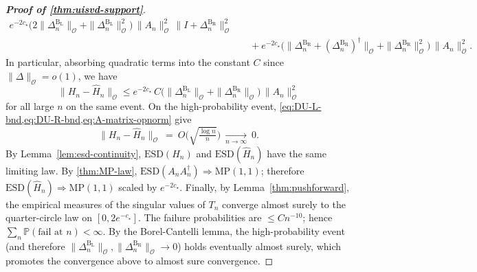 \documentclass[11pt,a4paper]{article}
\newcommand{\be}{\begin{equation}}
\newcommand{\ee}{\end{equation}}
\newcommand{\op}{\mathcal{O}}
\newcommand{\Prob}{\mathbb{P}}
\begin{document}
\begin{proof}[\textbf{Proof of \cref{thm:uisvd-support}}]
\begin{equation}
\begin{aligned}
e^{-2c_\star}
\Big(2\|\Delta^{\mathrm{B_L}}_{n}\|_{\op}
 +\|\Delta^{\mathrm{B_L}}_{n}\|_{\op}^2\Big)
\,\|A_n\|_{\op}^2
\,\|I+\Delta^{\mathrm{B_R}}_{n}\|_{\op}^2
\\
&\quad
+e^{-2c_\star}
\Big(\|\Delta^{\mathrm{B_R}}_{n}
 +(\Delta^{\mathrm{B_R}}_{n})^\dagger\|_{\op}
 +\|\Delta^{\mathrm{B_R}}_{n}\|_{\op}^2\Big)
\,\|A_n\|_{\op}^2.
\end{aligned}
\end{equation}
In particular, absorbing quadratic terms into the constant $C$ since $\|\Delta\|_{\op}=o(1)$, we have
\be\label{eq:105ref}
\|H_n-\widehat H_n\|_{\op}
\le e^{-2c_\star}\,C\bigl(\|\Delta^{\mathrm{B_L}}_{n}\|_{\op}+\|\Delta^{\mathrm{B_R}}_{n}\|_{\op}\bigr)\,\|A_n\|_{\op}^2
\ee
for all large $n$ on the same event. On the high-probability event, \cref{eq:DU-L-bnd,eq:DU-R-bnd,eq:A-matrix-opnorm} give
\begin{equation}
\|H_n-\widehat H_n\|_{\op}\ =\ O\!\Big(\sqrt{\tfrac{\log n}{n}}\Big)\ \xrightarrow[n\to\infty]{}\ 0.
\end{equation}
By Lemma~\ref{lem:esd-continuity}, $\mathrm{ESD}(H_n)$ and $\mathrm{ESD}(\widehat H_n)$ have the same limiting law. By \cref{thm:MP-law}, $\mathrm{ESD}(A_nA_n^\dagger)\Rightarrow \mathrm{MP}(1,1)$; therefore $\mathrm{ESD}(\widehat H_n)\Rightarrow \mathrm{MP}(1,1)$ scaled by $e^{-2c_\star}$. Finally, by Lemma~\ref{thm:pushforward}, the empirical measures of the singular values of $T_n$ converge almost surely to the quarter-circle law on $[0,2e^{-c_\star}]$. The failure probabilities are $\le C n^{-10}$; hence $\sum_n \Prob(\text{fail at }n)<\infty$. By the Borel-Cantelli lemma, the high-probability event (and therefore $\|\Delta^{\mathrm{B_L}}_{n}\|_{\op},\|\Delta^{\mathrm{B_R}}_{n}\|_{\op}\to 0$) holds eventually almost surely, which promotes the convergence above to almost sure convergence.
\end{proof}
\end{document}
